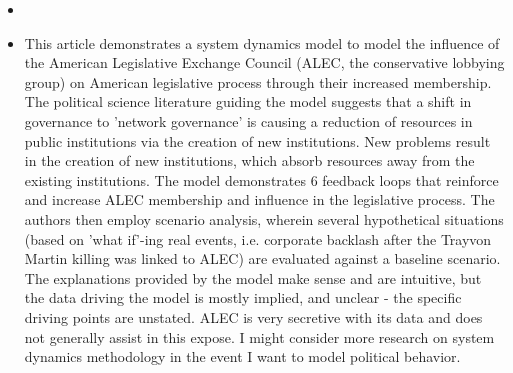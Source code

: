 \documentclass{article} \usepackage{filecontents}
\begin{document}
\begin{itemize}
\item \cite{andreasson2022ErodingPublic}
\item This article demonstrates a system dynamics model to model the
  influence of the American Legislative Exchange Council (ALEC, the
  conservative lobbying group) on American legislative process through
  their increased membership. The political science literature guiding
  the model suggests that a shift in governance to 'network
  governance' is causing a reduction of resources in public
  institutions via the creation of new institutions. New problems
  result in the creation of new institutions, which absorb resources
  away from the existing institutions. The model demonstrates 6
  feedback loops that reinforce and increase ALEC membership and
  influence in the legislative process. The authors then employ
  scenario analysis, wherein several hypothetical situations (based on
  'what if'-ing real events, i.e. corporate backlash after the Trayvon
  Martin killing was linked to ALEC) are evaluated against a baseline
  scenario. The explanations provided by the model make sense and are
  intuitive, but the data driving the model is mostly implied, and
  unclear - the specific driving points are unstated. ALEC is very
  secretive with its data and does not generally assist in this
  expose. I might consider more research on system dynamics
  methodology in the event I want to model political behavior.

\end{itemize}  
\end{document}
